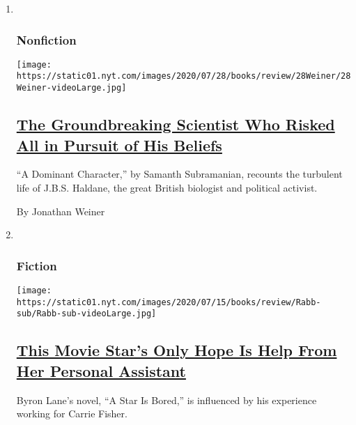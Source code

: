 \begin{enumerate}
\def\labelenumi{\arabic{enumi}.}
\item ~
  \hypertarget{nonfiction-3}{%
  \subsubsection{Nonfiction}\label{nonfiction-3}}

  \texttt{[image: https://static01.nyt.com/images/2020/07/28/books/review/28Weiner/28Weiner-videoLarge.jpg]}

  \hypertarget{the-groundbreaking-scientist-who-risked-all-in-pursuit-of-his-beliefs}{%
  \subsection{\texorpdfstring{\href{/2020/07/28/books/review/a-dominant-character-haldane-samanth-subramanian.html}{The
  Groundbreaking Scientist Who Risked All in Pursuit of His
  Beliefs}}{The Groundbreaking Scientist Who Risked All in Pursuit of His Beliefs}}\label{the-groundbreaking-scientist-who-risked-all-in-pursuit-of-his-beliefs}}

  ``A Dominant Character,'' by Samanth Subramanian, recounts the
  turbulent life of J.B.S. Haldane, the great British biologist and
  political activist.

  By Jonathan Weiner
\item ~
  \hypertarget{fiction-1}{%
  \subsubsection{Fiction}\label{fiction-1}}

  \texttt{[image: https://static01.nyt.com/images/2020/07/15/books/review/Rabb-sub/Rabb-sub-videoLarge.jpg]}

  \hypertarget{this-movie-stars-only-hope-is-help-from-her-personal-assistant}{%
  \subsection{\texorpdfstring{\href{/2020/07/28/books/review/a-star-is-bored-byron-lane.html}{This
  Movie Star's Only Hope Is Help From Her Personal
  Assistant}}{This Movie Star's Only Hope Is Help From Her Personal Assistant}}\label{this-movie-stars-only-hope-is-help-from-her-personal-assistant}}

  Byron Lane's novel, ``A Star Is Bored,'' is influenced by his
  experience working for Carrie Fisher.


\end{enumerate}
